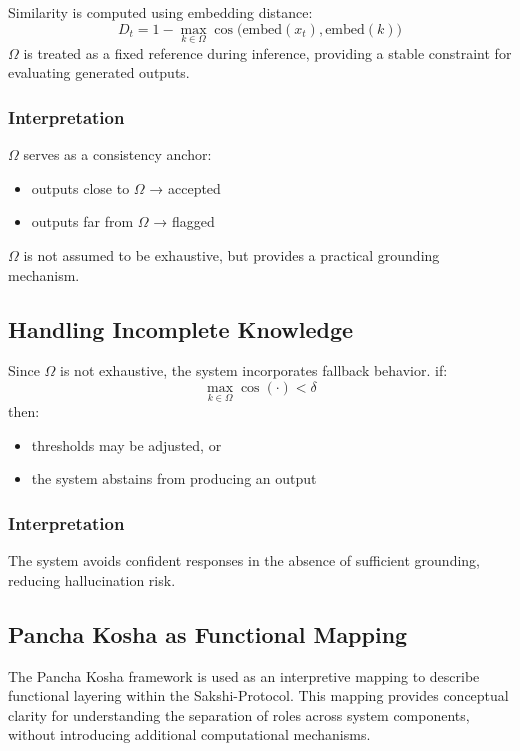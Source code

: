 \documentclass[12pt,a4paper]{article}
\begin{document}
Similarity is computed using embedding distance:
\[
D_t = 1 - \max_{k \in \Omega} \cos\big(\mathrm{embed}(x_t), \mathrm{embed}(k)\big)
\]
$\Omega$ is treated as a fixed reference during inference, providing a stable constraint for evaluating generated outputs.
\subsubsection *{Interpretation}
$\Omega$ serves as a consistency anchor:
\begin{itemize}
    \item outputs close to $\Omega$ → accepted
    \item outputs far from $\Omega$ → flagged
\end{itemize}
$\Omega$ is not assumed to be exhaustive, but provides a practical grounding mechanism.

\subsection{Handling Incomplete Knowledge}
Since $\Omega$ is not exhaustive, the system incorporates fallback behavior.
if:
\[
\max_{k \in \Omega} \cos\!\left(\cdot\right) < \delta
\]
then:

\begin{itemize}
\item thresholds may be adjusted, or
\item the system abstains from producing an output
\end{itemize}
\subsubsection *{Interpretation}
The system avoids confident responses in the absence of sufficient grounding, reducing hallucination risk.

\subsection{Pancha Kosha as Functional Mapping}
The Pancha Kosha framework is used as an interpretive mapping to describe functional layering within the Sakshi-Protocol. This mapping provides conceptual clarity for understanding the separation of roles across system components, without introducing additional computational mechanisms.
\end{document}
